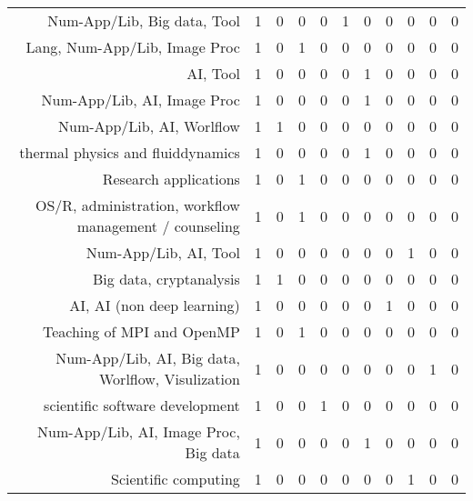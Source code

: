 {\begin{landscape}
\begin{longtable}[htb]{r|c|c|c|c|c|c|c|c|c|c}
{Num-App/Lib, Big data, Tool} & 1 & 0 & 0 & 0 & 1 & 0 & 0 & 0 & 0 & 0 \\%
{Lang, Num-App/Lib, Image Proc} & 1 & 0 & 1 & 0 & 0 & 0 & 0 & 0 & 0 & 0 \\%
{AI, Tool} & 1 & 0 & 0 & 0 & 0 & 1 & 0 & 0 & 0 & 0 \\%
{Num-App/Lib, AI, Image Proc} & 1 & 0 & 0 & 0 & 0 & 1 & 0 & 0 & 0 & 0 \\%
{Num-App/Lib, AI, Worlflow} & 1 & 1 & 0 & 0 & 0 & 0 & 0 & 0 & 0 & 0 \\%
{thermal physics and fluiddynamics} & 1 & 0 & 0 & 0 & 0 & 1 & 0 & 0 & 0 & 0 \\%
{Research applications} & 1 & 0 & 1 & 0 & 0 & 0 & 0 & 0 & 0 & 0 \\%
{OS/R, administration, workflow management / counseling} & 1 & 0 & 1 & 0 & 0 & 0 & 0 & 0 & 0 & 0 \\%
{Num-App/Lib, AI, Tool} & 1 & 0 & 0 & 0 & 0 & 0 & 0 & 1 & 0 & 0 \\%
{Big data, cryptanalysis} & 1 & 1 & 0 & 0 & 0 & 0 & 0 & 0 & 0 & 0 \\%
{AI, AI (non deep learning)} & 1 & 0 & 0 & 0 & 0 & 0 & 1 & 0 & 0 & 0 \\%
{Teaching of MPI and OpenMP} & 1 & 0 & 1 & 0 & 0 & 0 & 0 & 0 & 0 & 0 \\%
{Num-App/Lib, AI, Big data, Worlflow, Visulization} & 1 & 0 & 0 & 0 & 0 & 0 & 0 & 0 & 1 & 0 \\%
{scientific software development} & 1 & 0 & 0 & 1 & 0 & 0 & 0 & 0 & 0 & 0 \\%
{Num-App/Lib, AI, Image Proc, Big data} & 1 & 0 & 0 & 0 & 0 & 1 & 0 & 0 & 0 & 0 \\%
{Scientific computing} & 1 & 0 & 0 & 0 & 0 & 0 & 0 & 1 & 0 & 0 \\%
\hline%
\end{longtable}%
\end{landscape}}%
\clearpage%
